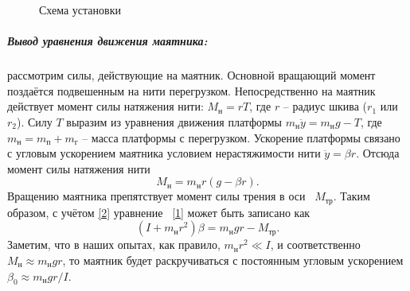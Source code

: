\documentclass[a4paper,12pt]{article}
\begin{document}
\begin{figure}[h]
	\caption{Схема установки}
	\label{fig:image}
\end{figure}



\subparagraph*{Вывод уравнения движения маятника: } рассмотрим силы, действующие на маятник. Основной вращающий момент поздаётся подвешенным на нити перегрузком. Непосредственно на маятник действует момент силы натяжения нити: $M_н = rT$, где $r$ -- радиус шкива ($r_1$ или $r_2$). Силу $T$ выразим из уравнения движения платформы $m_н\ddot{y}= m_нg - T$, где $m_н = m_п + m_г$ -- масса платформы с перегрузком. Ускорение платформы связано с угловым ускорением маятника условием нерастяжимости нити $\ddot{y}=\beta r$. Отсюда момент силы натяжения нити 
\begin{equation}\label{2}
M_н = m_нr(g - \beta r).
\end{equation}
Вращению маятника препятствует момент силы трения в оси  $M_{тр}$. Таким образом, с учётом \eqref{2} уравнение  \eqref{1} может быть записано как
\begin{equation}\label{3}
(I + m_нr^2)\beta = m_нgr - {M_{тр}}.
\end{equation}
Заметим, что в наших опытах, как правило, $m_нr^2 \ll I$, и соответственно $M_н \approx m_нgr$, то маятник будет раскручиваться с постоянным угловым ускорением $\beta _0 \approx m_нgr / I$.
\end{document}
